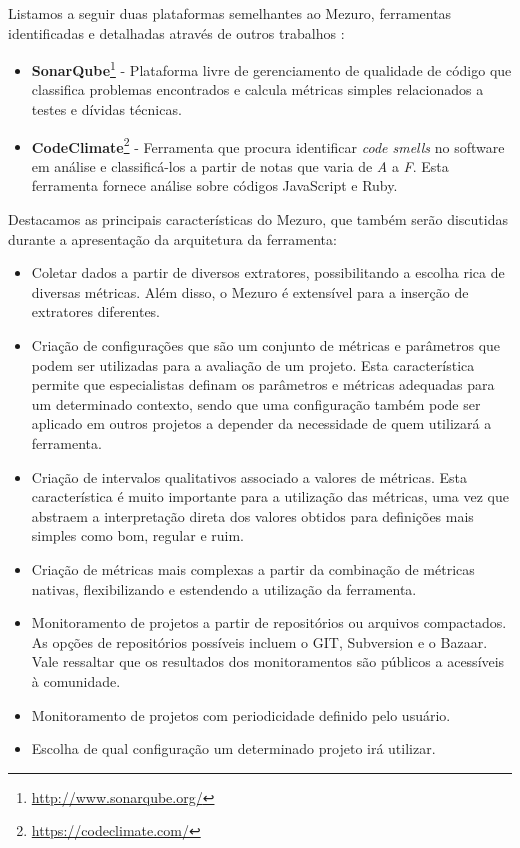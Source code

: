 %

Listamos a seguir duas plataformas semelhantes ao Mezuro, ferramentas identificadas e detalhadas  através de outros trabalhos \cite{meirelles2010mezuro}\cite{vieira2013}\cite{manzo2014}:

%

\begin{itemize}
\item \textbf{SonarQube}\footnote{\url{http://www.sonarqube.org/}} - Plataforma livre de gerenciamento de qualidade de código que classifica problemas encontrados e calcula métricas simples relacionados a testes e dívidas técnicas.
\item \textbf{CodeClimate}\footnote{\url{https://codeclimate.com/}} - Ferramenta que procura identificar \emph{code smells} no software em análise e classificá-los a partir de notas que varia de \emph{A} a \emph{F}. Esta ferramenta fornece análise sobre códigos JavaScript e Ruby.
\end{itemize}

%

Destacamos as principais características do Mezuro, que também serão discutidas durante a apresentação da arquitetura da ferramenta:

%

\begin{itemize}
\item Coletar dados a partir de diversos extratores, possibilitando a escolha  rica de diversas métricas. Além disso, o Mezuro é extensível para a inserção de extratores diferentes.

\item Criação de configurações que são um conjunto de métricas e parâmetros que podem ser utilizadas para a avaliação de um projeto. Esta característica permite que especialistas definam os parâmetros e métricas adequadas para um determinado contexto, sendo que uma configuração também pode ser aplicado em outros projetos a depender da necessidade de quem utilizará a ferramenta.

\item Criação de intervalos qualitativos associado a valores de métricas. Esta característica é muito importante para a utilização das métricas, uma vez que abstraem a interpretação direta dos valores obtidos para definições mais simples como bom, regular e ruim.

\item Criação de métricas mais complexas a partir da combinação de métricas nativas, flexibilizando e estendendo a utilização da ferramenta.

\item Monitoramento de projetos a partir de repositórios ou arquivos compactados. As opções de repositórios possíveis incluem o GIT, Subversion e o Bazaar. Vale ressaltar que os resultados dos monitoramentos são públicos a acessíveis à comunidade.

\item Monitoramento de projetos com periodicidade definido pelo usuário.

\item Escolha de qual configuração um determinado projeto irá utilizar.
\end{itemize}

